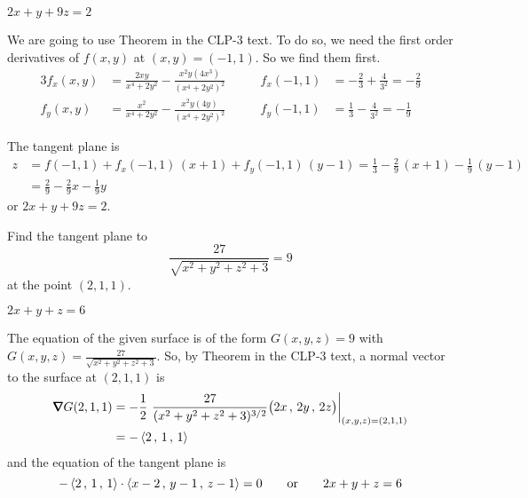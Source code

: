 %

\begin{answer}
$2x+y+9z=2$
\end{answer}

\begin{solution}
We are going to use Theorem  in the CLP-3 text.
To do so, we need the first order derivatives of $f(x,y)$ 
at $(x,y)=(-1,1)$. So we find them first.
\begin{alignat*}{3}
f_x(x,y)&=\frac{2xy}{x^4+2y^2}-\frac{x^2y(4x^3)}{{(x^4+2y^2)}^2}\qquad &
f_x(-1,1)&=-\frac{2}{3} +\frac{4}{3^2}=-\frac{2}{9}
\\
f_y(x,y)&=\frac{x^2}{x^4+2y^2}-\frac{x^2y(4y)}{{(x^4+2y^2)}^2}\qquad &
f_y(-1,1)&=\frac{1}{3} -\frac{4}{3^2}=-\frac{1}{9}
\end{alignat*}

The tangent plane is
\begin{align*}
z&=f(-1,1) + f_x(-1,1)\,(x+1) + f_y(-1,1)\,(y-1)
 =\frac{1}{3} -\frac{2}{9}\,(x+1) -\frac{1}{9}\,(y-1) \\
 &=\frac{2}{9}-\frac{2}{9}x-\frac{1}{9}y
\end{align*}
or $2x+y+9z=2$.
\end{solution}

\begin{question}[M200 2015D] %
Find the tangent plane to
\begin{equation*}
\frac{27}{\sqrt{x^2+y^2+z^2+3}}=9
\end{equation*}
at the point $(2, 1, 1)$.
\end{question}

%

\begin{answer}
$2x+y+z = 6$
\end{answer}

\begin{solution}
The equation of the given surface is of the form $G(x,y,z)=9$
with $G(x,y,z) =\frac{27}{\sqrt{x^2+y^2+z^2+3}}$. So,
by Theorem  in the CLP-3 text, a normal
vector to the surface at $(2,1,1)$ is
\begin{align*}
\vnabla G(2,1,1)
  &=-\frac{1}{2}\ \frac{27}{(x^2+y^2+z^2+3)^{3/2}}\big(2x\,,\,2y\,,\,2z\big)
                                          \bigg|_{(x,y,z)=(2,1,1)} \\
  &=-\llt 2\,,\,1\,,\,1\rgt
\end{align*}
and the equation of the tangent plane is
\begin{equation*}
-\left< 2\,,\,1\,,\,1\right>\cdot \left< x-2\,,\,y-1\,,\,z-1\right>=0\qquad\text{or}\qquad
2x+y+z = 6
\end{equation*}
\end{solution}

